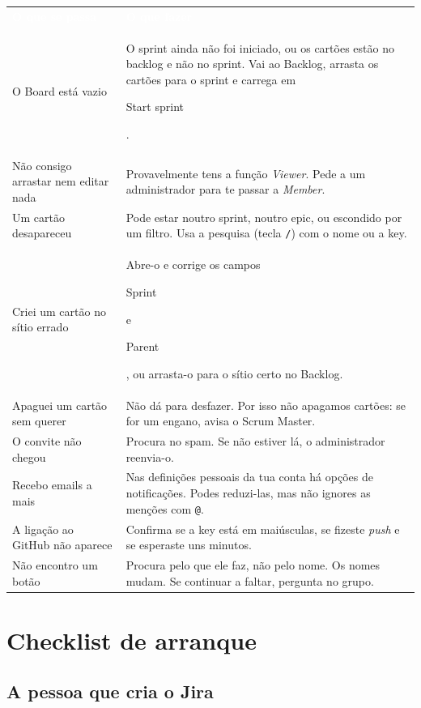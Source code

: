\documentclass[11pt,a4paper]{article}
\newcommand{\th}[1]{\textcolor{white}{\sffamily\bfseries #1}}
\newcommand{\btn}[1]{{\setlength{\fboxsep}{1.6pt}\colorbox{azulclaro}{\sffamily\small\strut #1}}}
\newcommand{\tabelaini}{\begingroup\small\renewcommand{\arraystretch}{1.45}\rowcolors{2}{azulclaro!55}{white}}
\newcommand{\tabelafim}{\endgroup}
\begin{document}
\tabelaini
\begin{tabularx}{\textwidth}{L{4.6cm} Y}
   \th{O que se passa} & \th{O que fazer} \\
  O Board está vazio & O sprint ainda não foi iniciado, ou os cartões estão no backlog e não no sprint. Vai ao Backlog, arrasta os cartões para o sprint e carrega em \btn{Start sprint}. \\
  Não consigo arrastar nem editar nada & Provavelmente tens a função \textit{Viewer}. Pede a um administrador para te passar a \textit{Member}. \\
  Um cartão desapareceu & Pode estar noutro sprint, noutro epic, ou escondido por um filtro. Usa a pesquisa (tecla \texttt{/}) com o nome ou a key. \\
  Criei um cartão no sítio errado & Abre-o e corrige os campos \btn{Sprint} e \btn{Parent}, ou arrasta-o para o sítio certo no Backlog. \\
  Apaguei um cartão sem querer & Não dá para desfazer. Por isso não apagamos cartões: se for um engano, avisa o Scrum Master. \\
  O convite não chegou & Procura no spam. Se não estiver lá, o administrador reenvia-o. \\
  Recebo emails a mais & Nas definições pessoais da tua conta há opções de notificações. Podes reduzi-las, mas não ignores as menções com \texttt{@}. \\
  A ligação ao GitHub não aparece & Confirma se a key está em maiúsculas, se fizeste \textit{push} e se esperaste uns minutos. \\
  Não encontro um botão & Procura pelo que ele faz, não pelo nome. Os nomes mudam. Se continuar a faltar, pergunta no grupo. \\
  \bottomrule
\end{tabularx}
\tabelafim

\section{Checklist de arranque}

\subsection{A pessoa que cria o Jira}
\end{document}

